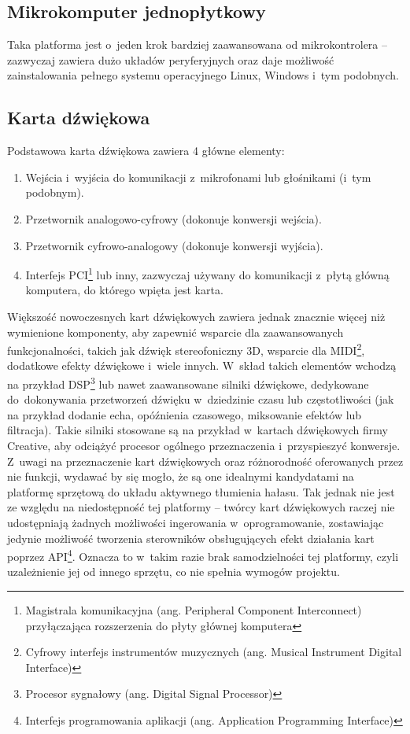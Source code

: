\subsection{Mikrokomputer jednopłytkowy}
\label{mikrokomp}
Taka platforma jest o~jeden krok bardziej zaawansowana od mikrokontrolera -- zazwyczaj zawiera dużo układów peryferyjnych oraz daje możliwość zainstalowania pełnego systemu operacyjnego Linux, Windows i~tym podobnych. 
\subsection{Karta dźwiękowa}
\label{soundcard}
Podstawowa karta dźwiękowa zawiera 4 główne elementy:
\begin{enumerate}
	\item Wejścia i~wyjścia do komunikacji z~mikrofonami lub głośnikami (i~tym podobnym).
	\item Przetwornik analogowo-cyfrowy (dokonuje konwersji wejścia).
	\item Przetwornik cyfrowo-analogowy (dokonuje konwersji wyjścia).
	\item Interfejs PCI\footnote{Magistrala komunikacyjna (ang. Peripheral Component Interconnect) przyłączająca rozszerzenia do płyty głównej komputera} lub inny, zazwyczaj używany do komunikacji z~płytą główną komputera, do którego wpięta jest karta.
\end{enumerate}
Większość nowoczesnych kart dźwiękowych zawiera jednak znacznie więcej niż wymienione komponenty, aby zapewnić wsparcie dla zaawansowanych funkcjonalności, takich jak dźwięk stereofoniczny 3D, wsparcie dla MIDI\footnote{Cyfrowy interfejs instrumentów muzycznych (ang. Musical Instrument Digital Interface)}, dodatkowe efekty dźwiękowe i~wiele innych. W~skład takich elementów wchodzą na przykład DSP\footnote{Procesor sygnałowy (ang. Digital Signal Processor)} lub nawet zaawansowane silniki dźwiękowe, dedykowane do~dokonywania przetworzeń dźwięku w~dziedzinie czasu lub częstotliwości (jak na przykład dodanie echa, opóźnienia czasowego, miksowanie efektów lub filtracja). Takie silniki stosowane są na przykład w~kartach dźwiękowych firmy Creative, aby odciążyć procesor ogólnego przeznaczenia i~przyspieszyć konwersje.\\
Z~uwagi na przeznaczenie kart dźwiękowych oraz różnorodność oferowanych przez nie funkcji, wydawać by się mogło, że są one idealnymi kandydatami na platformę sprzętową do układu aktywnego tłumienia hałasu. Tak jednak nie jest ze względu na niedostępność tej platformy -- twórcy kart dźwiękowych raczej nie udostępniają żadnych możliwości ingerowania w~oprogramowanie, zostawiając jedynie możliwość tworzenia sterowników obsługujących efekt działania kart poprzez API\footnote{Interfejs programowania aplikacji (ang. Application Programming Interface)}. Oznacza to w~takim razie brak samodzielności tej platformy, czyli uzależnienie jej od innego sprzętu, co nie spełnia wymogów projektu.
